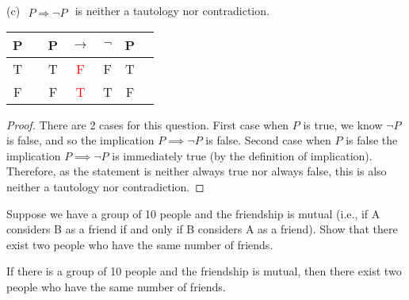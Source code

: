 \documentclass{homework}
\begin{document}
\begin{claim}
    (c) $\begin{aligned}P\Rightarrow\neg P\end{aligned}$ is neither a tautology nor contradiction. 
\end{claim}

\begin{center}
\begin{tabular}{@{ }c | c@{ }@{ }c@{ }@{ }c@{ }@{ }c@{ }@{ }c@{ }@{ }c}
P &  & P & $\rightarrow$ & $\lnot$ & P & \\
\hline 
T &  & T & \textcolor{red}{F} & F & T & \\
F &  & F & \textcolor{red}{T} & T & F & \\
\end{tabular}
\end{center}
\begin{proof}
    There are 2 cases for this question.  First case when $P$ is true, we know $\neg P$ is false, and so the implication $P\implies\neg P$ is false. Second case when $P$ is false the implication $P\implies\neg P$ is immediately true (by the definition of implication). Therefore, as the statement is neither always true nor always false, this is also neither a tautology nor contradiction.
\end{proof}

\newpage

\question Suppose we have a group of 10 people and the friendship is mutual (i.e., if A considers B as a friend if and only if B considers A as a friend).
Show that there exist two people who have the same number of friends.

\begin{claim}
    If there is a group of 10 people and the friendship is mutual, then there exist two people who have the same number of friends. 
\end{claim}
\end{document}
